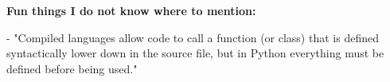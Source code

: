 \documentclass[onecolumn]{article}
\begin{document}
\textbf{Fun things I do not know where to mention:}

- "Compiled languages allow code to call a function (or class) that is 
defined syntactically lower down in the source file, but in Python everything 
must be 
defined before being used." \parencite{GuoMarkelZhang2020}










\newpage
\printbibliography
\end{document}
